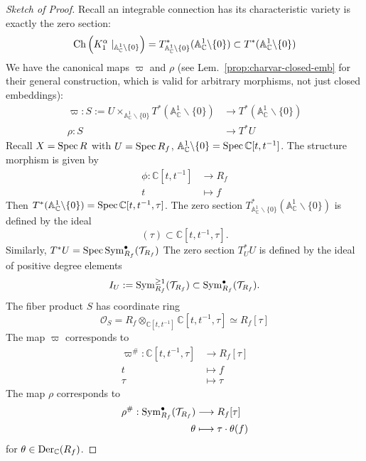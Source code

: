 \begin{proof}[Sketch of Proof]
    Recall an integrable connection has its characteristic variety is exactly the zero section:
    \[
        \operatorname{Ch}\left(K_1^\alpha\mid_{\mathbb{A}^1_{\mathbb{C}}\backslash\{0\}}\right) = T^\ast_{\mathbb{A}^1_{\mathbb{C}}\backslash\{0\}} (\mathbb{A}^1_{\mathbb{C}}\backslash\{0\}) \subset T^\ast (\mathbb{A}^1_{\mathbb{C}}\backslash\{0\})
    \]
    We have the canonical maps $\varpi$ and $\rho$ (see Lem.~\ref{prop:charvar-closed-emb} for their general construction, which is valid for arbitrary morphisms, not just closed embeddings):
    \begin{align*}
        \varpi: S := U \times_{\mathbb{A}^1_{\mathbb{C}}\backslash\{0\}} T^\ast (\mathbb{A}^1_{\mathbb{C}}\backslash\{0\}) & \longrightarrow T^\ast (\mathbb{A}^1_{\mathbb{C}}\backslash\{0\}) \\
        \rho: S                                                                                                            & \longrightarrow T^\ast U
    \end{align*}
    Recall $X = \operatorname{Spec} R$ with $U = \operatorname{Spec} R_f$,
    $\mathbb{A}^1_{\mathbb{C}}\backslash\{0\} = \operatorname{Spec} \mathbb{C}[t, t^{-1}]$.
    The structure morphism is given by
    \begin{align*}
        \phi: \mathbb{C}[t, t^{-1}] & \longrightarrow R_f \\
        t                           & \longmapsto f
    \end{align*}
    Then $T^\ast(\mathbb{A}^1_{\mathbb{C}}\backslash\{0\}) = \operatorname{Spec} \mathbb{C}[t, t^{-1}, \tau]$.
    The zero section $T^\ast_{\mathbb{A}^1_{\mathbb{C}}\backslash\{0\}}(\mathbb{A}^1_{\mathbb{C}}\backslash\{0\})$
    is defined by the ideal
    \[
        (\tau) \subset \mathbb{C}[t, t^{-1}, \tau].
    \]
    Similarly, $T^\ast U = \operatorname{Spec} \operatorname{Sym}^\bullet_{R_f}(\mathcal{T}_{R_f})$
    The zero section $T^\ast_U U$ is defined by the ideal of positive degree elements
    \[
        I_U := \operatorname{Sym}_{R_f}^{\ge 1}(\mathcal{T}_{R_f}) \subset \operatorname{Sym}^\bullet_{R_f}(\mathcal{T}_{R_f}).
    \]
    The fiber product $S$ has coordinate ring
    \[
        \mathcal{O}_S = R_f \otimes_{\mathbb{C}[t,t^{-1}]} \mathbb{C}[t,t^{-1},\tau] \simeq R_f[\tau]
    \]
    The map $\varpi$ corresponds to
    \begin{align*}
        \varpi^\#: \mathbb{C}[t,t^{-1},\tau] & \longrightarrow R_f[\tau] \\
        t                                    & \longmapsto f             \\
        \tau                                 & \longmapsto \tau
    \end{align*}
    The map $\rho$ corresponds to
    \begin{align*}
        \rho^\#: \operatorname{Sym}^\bullet_{R_f}(\mathcal{T}_{R_f}) & \longrightarrow R_f[\tau]        \\
        \theta                                         & \longmapsto \tau \cdot \theta(f)
    \end{align*}
    for $\theta \in \operatorname{Der}_\mathbb{C}(R_f)$.


\end{proof}
